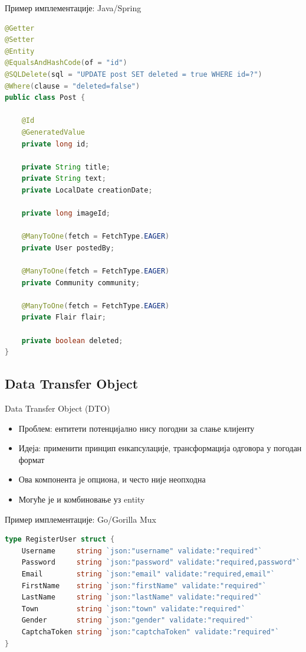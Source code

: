 \documentclass{beamer}
\begin{document}
    \begin{frame}[fragile]{Пример имплементације: Java/Spring}
        \begin{adjustbox}{width=\textwidth,height=0.7\textheight,keepaspectratio}
			\begin{lstlisting}[language=java]
@Getter
@Setter
@Entity
@EqualsAndHashCode(of = "id")
@SQLDelete(sql = "UPDATE post SET deleted = true WHERE id=?")
@Where(clause = "deleted=false")
public class Post {

    @Id
    @GeneratedValue
    private long id;

    private String title;
    private String text;
    private LocalDate creationDate;

    private long imageId;

    @ManyToOne(fetch = FetchType.EAGER)
    private User postedBy;

    @ManyToOne(fetch = FetchType.EAGER)
    private Community community;

    @ManyToOne(fetch = FetchType.EAGER)
    private Flair flair;

    private boolean deleted;
}
			\end{lstlisting}
		\end{adjustbox}
    \end{frame}
    
    \subsection{Data Transfer Object}
    
    \begin{frame}{Data Transfer Object (DTO)}
        \begin{itemize}
			\item Проблем: ентитети потенцијално нису погодни за слање клијенту
			\item Идеја: применити принцип енкапсулације, трансформација одговора у погодан формат
			\item Ова компонента је опциона, и често није неопходна
			\item Могуће је и комбиновање уз entity
        \end{itemize}
    \end{frame}
    
            \begin{frame}[fragile]{Пример имплементације: Go/Gorilla Mux}
    	\begin{adjustbox}{width=\textwidth,height=\textheight,keepaspectratio}
			\begin{lstlisting}[language=go]
type RegisterUser struct {
	Username     string `json:"username" validate:"required"`
	Password     string `json:"password" validate:"required,password"`
	Email        string `json:"email" validate:"required,email"`
	FirstName    string `json:"firstName" validate:"required"`
	LastName     string `json:"lastName" validate:"required"`
	Town         string `json:"town" validate:"required"`
	Gender       string `json:"gender" validate:"required"`
	CaptchaToken string `json:"captchaToken" validate:"required"`
}
			\end{lstlisting}
		\end{adjustbox}
    \end{frame}
    
\end{document}
